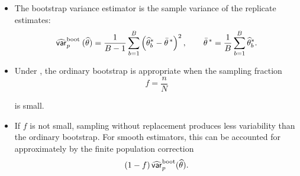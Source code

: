 \documentclass{my_eth_beamer}
\numberwithin{equation}{section}
\begin{document}
\begin{frame}
    \begin{itemize}
    \setlength{\itemsep}{9pt}
        \item The \alert{bootstrap variance estimator} is the sample variance
            of the replicate estimates:
            \begin{equation*}
                \widehat{\mathsf{var}}_p^{\mathrm{boot}\;}(\widehat{\theta}) = \frac{1}{B-1}
                \sum_{b=1}^B
                \left(\widehat{\theta}_b^*
                -\bar{\theta}^{\,*}\right)^2, \qquad
                \bar{\theta}^{\,*} =
                \frac{1}{B}\sum_{b=1}^B\widehat{\theta}_b^*.
            \end{equation*}
        \item Under \SRS, the ordinary bootstrap is appropriate when the
            \alert{sampling fraction}
            \begin{equation*}
            f=\frac{n}{N}
            \end{equation*}

            \vspace{-1.5em}

            is small.
        \item If $f$ is not small, sampling without replacement produces less
            variability than the ordinary bootstrap. For smooth estimators,
            this can be accounted for approximately by the \alert{finite
            population correction} \citep[][Chapter 5]{wolter_2007}
            \vspace{-0.5em}
            \begin{equation*}
                (1-f)\, \widehat{\mathsf{var}}_p^{\mathrm{boot}}(\widehat{\theta}).
            \end{equation*}
    \end{itemize}
\end{frame}
\end{document}
